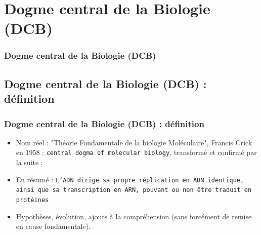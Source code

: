 \documentclass{beamer}
\begin{document}

\section{Dogme central de la Biologie (DCB)}
\begin{frame}
	\frametitle{Dogme central de la Biologie (DCB)}
	\tableofcontents[sections=2,currentsection,subsectionstyle=show/shaded/hide]
\end{frame} 

\subsection{Dogme central de la Biologie (DCB) : d{\'e}finition}
\begin{frame}
	\frametitle{Dogme central de la Biologie (DCB) : d{\'e}finition}
	\begin{itemize}
		\item Nom r{\'e}el : "Th{\'e}orie Fondamentale de la biologie Mol{\'e}culaire", Francis Crick en 1958 : \texttt{central dogma of molecular biology}, transform{\'e} et confirm{\'e} par la suite ; 
		\item En r{\'e}sum{\'e} : \texttt{L'ADN dirige sa propre r{\'e}plication en ADN identique, ainsi que sa transcription en ARN, pouvant ou non {\^e}tre traduit en prot{\'e}ines}
		\item Hypoth{\`e}ses, {\'e}volution, ajouts {\`a} la compr{\'e}hension (sans forc{\'e}ment de remise en cause fondamentale). 
	\end{itemize}
\end{frame}
\end{document}
